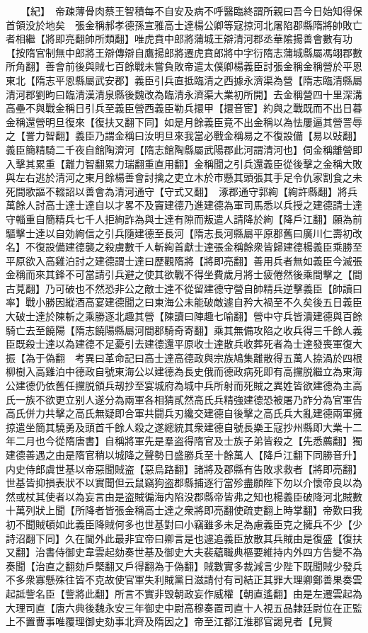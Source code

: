 　　【紀】　帝疎薄骨肉蔡王智積每不自安及病不呼醫臨終謂所親曰吾今日始知得保首領没於地矣　張金稱郝孝德孫宣雅高士達楊公卿等寇掠河北屠陷郡縣隋將帥敗亡者相繼【將即亮翻帥所類翻】唯虎賁中郎將蒲城王辯清河郡丞華隂揚善會數有功【按隋官制無中郎將王辯傳辯自鷹揚郎將遷虎賁郎將中字衍隋志蒲城縣屬馮翊郡數所角翻】善會前後與賊七百餘戰未嘗負敗帝遣太僕卿楊義臣討張金稱金稱營於平恩東北【隋志平恩縣屬武安郡】義臣引兵直抵臨清之西據永濟渠為營【隋志臨清縣屬清河郡劉昫曰臨清漢清泉縣後魏改為臨清永濟渠大業初所開】去金稱營四十里深溝高壘不與戰金稱日引兵至義臣營西義臣勒兵擐甲【擐音宦】約與之戰既而不出日暮金稱還營明旦復來【復扶又翻下同】如是月餘義臣竟不出金稱以為怯屢逼其營詈辱之【詈力智翻】義臣乃謂金稱曰汝明旦來我當必戰金稱易之不復設備【易以䜴翻】義臣簡精騎二千夜自館陶濟河【隋志館陶縣屬武陽郡此河謂清河也】伺金稱離營即入擊其累重【離力智翻累力瑞翻重直用翻】金稱聞之引兵還義臣從後擊之金稱大敗與左右逃於清河之東月餘楊善會討擒之吏立木於市懸其頭張其手足令仇家割食之未死間歌謳不輟詔以善會為清河通守【守式又翻】　涿郡通守郭絢【絢許縣翻】將兵萬餘人討高士達士達自以才畧不及竇建德乃進建德為軍司馬悉以兵授之建德請士達守輜重自簡精兵七千人拒絢詐為與士達有隙而叛遣人請降於絢【降戶江翻】願為前驅擊士達以自効絢信之引兵隨建德至長河【隋志長河縣屬平原郡舊曰廣川仁壽初改名】不復設備建德襲之殺虜數千人斬絢首獻士達張金稱餘衆皆歸建德楊義臣乘勝至平原欲入高雞泊討之建德謂士達曰歷觀隋將【將即亮翻】善用兵者無如義臣今滅張金稱而來其鋒不可當請引兵避之使其欲戰不得坐費歲月將士疲倦然後乘間擊之【間古莧翻】乃可破也不然恐非公之敵士達不從留建德守營自帥精兵逆擊義臣【帥讀曰率】戰小勝因縱酒高宴建德聞之曰東海公未能破敵遽自矜大禍至不久矣後五日義臣大破士達於陳斬之乘勝逐北趣其營【陳讀曰陣趣七喻翻】營中守兵皆潰建德與百餘騎亡去至饒陽【隋志饒陽縣屬河間郡騎奇寄翻】乘其無備攻陷之收兵得三千餘人義臣既殺士達以為建德不足憂引去建德還平原收士達散兵收葬死者為士達發喪軍復大振【為于偽翻　考異曰革命記曰高士達高德政與宗族鳩集離散得五萬人捺渦於四根柳樹入高雞泊中德政自號東海公以建德為長史俄而德政病死即有高攩脱繼立為東海公建德仍依舊任攩脱領兵刼抄至宴城府為城中兵所射而死賊之異姓皆欲建德為主高氏一族不欲更立别人遂分為兩軍各相猜貳然高氏兵精強建德恐被屠乃詐分為官軍告高氏併力共擊之高氏無疑即合軍共闘兵刃纔交建德自後擊之高氏兵大亂建德兩軍擁掠遣坐簡其驍勇及頭首千餘人殺之遂總統其衆建德自號長樂王寇抄州縣即大業十二年二月也今從隋唐書】自稱將軍先是羣盗得隋官及士族子弟皆殺之【先悉薦翻】獨建德善遇之由是隋官稍以城降之聲勢日盛勝兵至十餘萬人【降戶江翻下同勝音升】　内史侍郎虞世基以帝惡聞賊盗【惡烏路翻】諸將及郡縣有告敗求救者【將即亮翻】世基皆抑損表狀不以實聞但云鼠竊狗盗郡縣捕逐行當殄盡願陛下勿以介懷帝良以為然或杖其使者以為妄言由是盗賊徧海内陷没郡縣帝皆弗之知也楊義臣破降河北賊數十萬列狀上聞【所降者皆張金稱高士達之衆將即亮翻使疏吏翻上時掌翻】帝歎曰我初不聞賊頓如此義臣降賊何多也世基對曰小竊雖多未足為慮義臣克之擁兵不少【少詩沼翻下同】久在閫外此最非宜帝曰卿言是也遽追義臣放散其兵賊由是復盛【復扶又翻】治書侍御史韋雲起劾奏世基及御史大夫裴藴職典樞要維持内外四方告變不為奏聞【治直之翻劾戶槩翻又戶得翻為于偽翻】賊數實多裁減言少陛下既聞賊少發兵不多衆寡懸殊往皆不克故使官軍失利賊黨日滋請付有司結正其罪大理卿鄭善果奏雲起詆訾名臣【訾將此翻】所言不實非毁朝政妄作威權【朝直遙翻】由是左遷雲起為大理司直【唐六典後魏永安三年御史中尉高穆奏置司直十人視五品隸廷尉位在正監上不置曹事唯覆理御史劾事北齊及隋因之】帝至江都江淮郡官謁見者【見賢